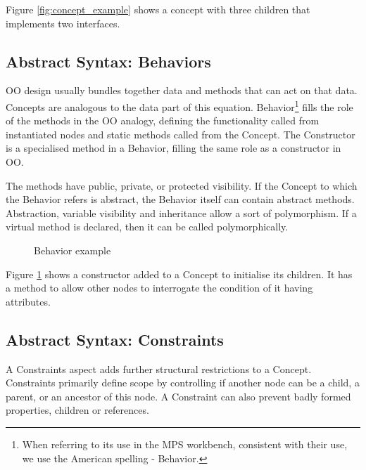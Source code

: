 Figure \ref{fig:concept_example} shows a concept with three children that implements two interfaces.

\subsection{Abstract Syntax: Behaviors}
OO design usually bundles together data and methods that can act on that data.
Concepts are analogous to the data part of this equation.
Behavior\footnote{When referring to its use in the MPS workbench, consistent with their use, we use the American spelling - Behavior.}
fills the role of the methods in the OO analogy, defining the functionality called from instantiated nodes and static methods called from the Concept.
The Constructor is a specialised method in a Behavior, filling the same role as a constructor in OO.

The methods have public, private, or protected visibility.
If the Concept to which the Behavior refers is abstract, the Behavior itself can contain abstract methods.
Abstraction, variable visibility and inheritance allow a sort of polymorphism.
If a virtual method is declared, then it can be called polymorphically.

\begin{figure}
    \centering
    \caption{Behavior example}
    \label{fig:behavior_example}
\end{figure}

Figure \ref{fig:behavior_example} shows a constructor added to a Concept to initialise its children.
It has a method to allow other nodes to interrogate the condition of it having attributes.
 
\subsection{Abstract Syntax: Constraints}
A Constraints aspect adds further structural restrictions to a Concept.
Constraints primarily define scope by controlling if another node can be a child, a parent, or an ancestor of this node.
A Constraint can also prevent badly formed properties, children or references.


